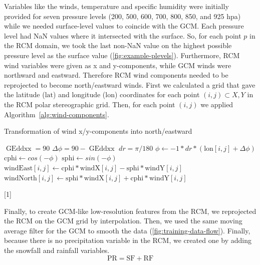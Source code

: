 \documentclass[a4paper,11pt,oneside]{report}
\begin{document}
Variables like the winds, temperature and specific humidity were initially provided for seven pressure levels (200, 500, 600, 700, 800, 850, and 925 \si{hpa}) while we needed surface-level values to coincide with the GCM. Each pressure level had NaN values where it intersected with the surface. So, for each point $p$ in the RCM domain, we took the last non-NaN value on the highest possible pressure level as the surface value (\autoref{fig:example-plevels}). Furthermore, RCM wind variables were given as x and y-components, while GCM winds were northward and eastward. Therefore RCM wind components needed to be reprojected to become north/eastward winds. First we calculated a grid that gave the latitude ($\mathrm{lat}$) and longitude ($\mathrm{lon}$) coordinates for each point $(i,j)\subset X,Y $ in the RCM polar stereographic grid. Then, for each point $(i,j)$ we applied Algorithm~\ref{alg:wind-components}.
    \begin{algorithm}
    \caption{Transformation of wind x/y-components into north/eastward}\label{alg:wind-components}
    \begin{algorithmic}[1]
    \State $\operatorname{GEddxx} = 90$
    \State $\Delta \phi = 90 - \operatorname{GEddxx}$
    \State $dr = \pi / 180$ 
    \State $\phi \gets -1*dr*(\mathrm{lon}[i,j] + \Delta \phi)$
    \State $\mathrm{cphi} \gets cos(-\phi)$
    \State $\mathrm{sphi} \gets sin(-\phi)$
    \State  $\mathrm{windEast}[i, j] \gets \mathrm{cphi} * \mathrm{windX}[i, j] - \mathrm{sphi} * \mathrm{windY}[i,j]$ 
    \State $\mathrm{windNorth}[i, j] \gets  \mathrm{sphi} * \mathrm{windX}[i, j] + \mathrm{cphi} * \mathrm{windY}[i, j]$ 
    \EndFor
    \end{algorithmic}[1]
    \end{algorithm}
Finally, to create GCM-like low-resolution features from the RCM, we reprojected the RCM on the GCM grid by interpolation. Then, we used the same moving average filter for the GCM to smooth the data (\autoref{fig:training-data-flow}). Finally, because there is no precipitation variable in the RCM, we created one by adding the snowfall and rainfall variables. 
    \begin{equation*}
        \mathrm{PR} = \mathrm{SF} + \mathrm{RF}
    \end{equation*}
\end{document}
